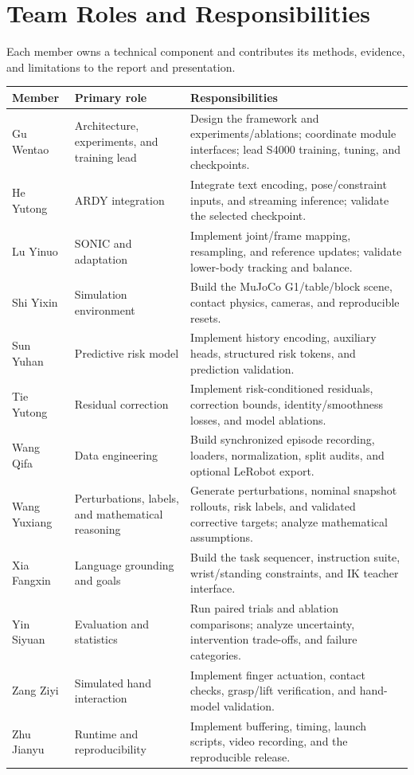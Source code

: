 \documentclass[11pt,a4paper]{article}
\begin{document}
\section{Team Roles and Responsibilities}
Each member owns a technical component and contributes its methods, evidence,
and limitations to the report and presentation.

\begingroup
\small
\renewcommand{\arraystretch}{1.1}
\begin{tabularx}{\linewidth}{@{}>{\raggedright\arraybackslash}p{26mm}>{\raggedright\arraybackslash}p{35mm}Y@{}}
\toprule
\textbf{Member} & \textbf{Primary role} & \textbf{Responsibilities} \\
\midrule
Gu Wentao & Architecture, experiments, and training lead &
Design the framework and experiments/ablations; coordinate module interfaces;
lead S4000 training, tuning, and checkpoints. \\
\addlinespace[2pt]
He Yutong & ARDY integration &
Integrate text encoding, pose/constraint inputs, and streaming inference;
validate the selected checkpoint. \\
\addlinespace[2pt]
Lu Yinuo & SONIC and adaptation &
Implement joint/frame mapping, resampling, and reference updates;
validate lower-body tracking and balance. \\
\addlinespace[2pt]
Shi Yixin & Simulation environment &
Build the MuJoCo G1/table/block scene, contact physics, cameras,
and reproducible resets. \\
\addlinespace[2pt]
Sun Yuhan & Predictive risk model &
Implement history encoding, auxiliary heads, structured risk tokens,
and prediction validation. \\
\addlinespace[2pt]
Tie Yutong & Residual correction &
Implement risk-conditioned residuals, correction bounds,
identity/smoothness losses, and model ablations. \\
\addlinespace[2pt]
Wang Qifa & Data engineering &
Build synchronized episode recording, loaders, normalization,
split audits, and optional LeRobot export. \\
\addlinespace[2pt]
Wang Yuxiang & Perturbations, labels, and mathematical reasoning  &
Generate perturbations, nominal snapshot rollouts, risk labels,
and validated corrective targets; analyze mathematical assumptions. \\
\addlinespace[2pt]
Xia Fangxin & Language grounding and goals &
Build the task sequencer, instruction suite, wrist/standing constraints,
and IK teacher interface. \\
\addlinespace[2pt]
Yin Siyuan & Evaluation and statistics &
Run paired trials and ablation comparisons; analyze uncertainty,
intervention trade-offs, and failure categories. \\
\addlinespace[2pt]
Zang Ziyi & Simulated hand interaction &
Implement finger actuation, contact checks, grasp/lift verification,
and hand-model validation. \\
\addlinespace[2pt]
Zhu Jianyu & Runtime and reproducibility &
Implement buffering, timing, launch scripts, video recording,
and the reproducible release. \\
\bottomrule
\end{tabularx}
\endgroup
\end{document}

